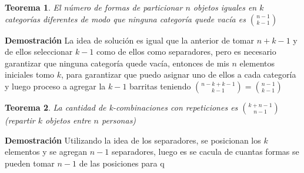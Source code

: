 \documentclass[a4paper,12pt]{report}
\newtheorem*{teo}{Teorema}
\begin{document}
\begin{teo}
    El número de formas de particionar $n$ objetos iguales en $k$ categorías diferentes de modo que ninguna categor\'ia quede vac\'ia es ${n-1}\choose{k-1}$
   \end{teo}
   
   \textbf{Demostración}
La idea de soluci\'on es igual que la anterior de tomar $n + k -1$ y de ellos seleccionar $k-1$ como de ellos como separadores, pero es necesario garantizar que ninguna categor\'ia quede vac\'ia, entonces de mis $n$ elementos iniciales tomo $k$, para garantizar que puedo asignar uno de ellos a cada categor\'ia y luego 
proceso a agregar la $k-1$ barritas teniendo  ${n - k + k-1}\choose{k-1}$$=$${n -1}\choose{k-1}$


\begin{teo}
   La cantidad de k-combinaciones con repeticiones es ${k+n-1}\choose{n-1}$ (repartir $k$ objetos entre $n$ personas)
\end{teo}

\textbf{Demostración}
Utilizando la idea de los separadores, se posicionan los $k$ elementos y se agregan $n -1$ separadores, luego es se cacula de cuantas formas se pueden tomar $n-1$ de las posiciones para q
\end{document}

